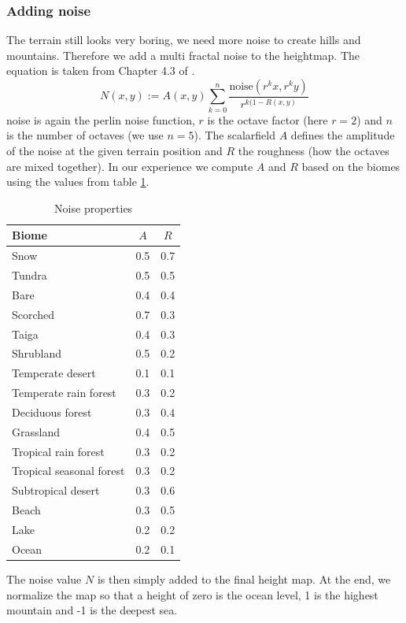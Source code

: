 \documentclass[journal, letterpaper]{IEEEtran}
\begin{document}
\subsubsection{Adding noise}
The terrain still looks very boring, we need more noise to create hills and mountains.
Therefore we add a multi fractal noise to the heightmap. The equation is taken from Chapter 4.3 of \cite{Hnaidi.2010}.
\begin{equation}
	N(x,y) := A(x,y) \sum_{k=0}^n \frac{\text{noise}(r^k x, r^k y)}{r^{k(1-R(x,y)}}
\label{eq:HeightmapNoise}
\end{equation}
noise is again the perlin noise function, $r$ is the octave factor (here $r=2$) and $n$ is the number of octaves (we use $n=5$). The scalarfield $A$ defines the amplitude of the noise at the given terrain position and $R$ the roughness (how the octaves are mixed together).
In our experience we compute $A$ and $R$ based on the biomes using the values from table \ref{tab:NoiseProperties}.
\begin{table}[htbp]
	\centering
		\begin{tabular}{l|c|c}
			Biome & $A$ & $R$ \\ \hline
			Snow & 0.5 & 0.7 \\
			Tundra & 0.5 & 0.5 \\
			Bare & 0.4 & 0.4 \\
			Scorched & 0.7 & 0.3 \\
			Taiga & 0.4 & 0.3 \\
			Shrubland & 0.5 & 0.2 \\
			Temperate desert & 0.1 & 0.1 \\
			Temperate rain forest & 0.3 & 0.2 \\
			Deciduous forest & 0.3 & 0.4 \\
			Grassland & 0.4 & 0.5 \\
			Tropical rain forest & 0.3 & 0.2 \\
			Tropical seasonal forest & 0.3 & 0.2 \\
			Subtropical desert & 0.3 & 0.6 \\
			Beach & 0.3 & 0.5 \\
			Lake & 0.2 & 0.2 \\
			Ocean & 0.2 & 0.1
		\end{tabular}
	\caption{Noise properties}
	\label{tab:NoiseProperties}
\end{table}
The noise value $N$ is then simply added to the final height map.
At the end, we normalize the map so that a height of zero is the ocean level, 1 is the highest mountain and -1 is the deepest sea.
\end{document}
